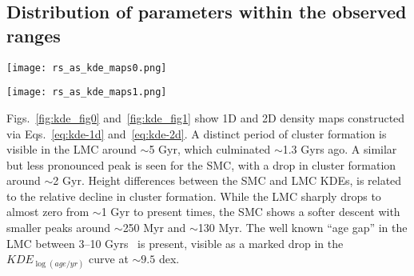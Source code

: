 \documentclass{aa}
\begin{document}

\subsection{Distribution of parameters within the observed ranges}
\label{ssec:dist_ranges}

\begin{figure*}
\texttt{[image: rs\_as\_kde\_maps0.png]}
\caption{Adaptive Gaussian KDEs for age, metallicity, and mass. Top and right
plots are 1D KDEs, center plots are 2D KDEs. Observed clusters are plotted as
red and blue stars for the S/LMC, respectively. Sizes are scaled according to
each cluster's radius. A small scatter is introduced for clarity.}
\label{fig:kde_fig0}
\end{figure*}

\begin{figure*}
\texttt{[image: rs\_as\_kde\_maps1.png]}
\caption{Same as Fig.~\ref{fig:kde_fig0} for $E_{(B-V)}$ and distance
modulus.}
\label{fig:kde_fig1}
\end{figure*}

Figs.~\ref{fig:kde_fig0} and~\ref{fig:kde_fig1} show 1D and 2D density maps
constructed via Eqs.~\ref{eq:kde-1d} and~\ref{eq:kde-2d}.
%
%
A distinct period of cluster formation is visible in the LMC around ${\sim}$5
Gyr, which culminated ${\sim}$1.3 Gyrs ago. A similar but less
pronounced peak is seen for the SMC, with a drop in cluster formation around
${\sim}$2 Gyr.
Height differences between the SMC and LMC KDEs, is related to the relative
decline in cluster formation. While the LMC sharply drops to almost zero from
${\sim}$1 Gyr to present times, the SMC shows a softer descent with smaller
peaks around ${\sim}$250 Myr and ${\sim}$130 Myr.
The well known ``age gap'' in the LMC between 3--10 Gyrs~\citep{Balbinot_2010}
is present, visible as a marked drop in the $KDE_{\log(age/yr)}$ curve at
$\sim9.5$ dex.
\end{document}
